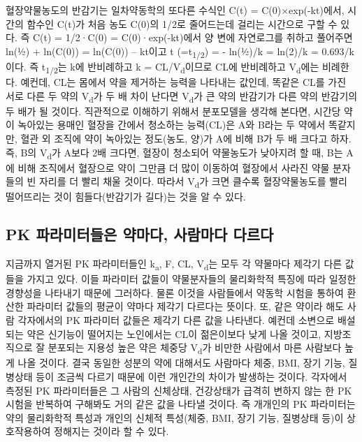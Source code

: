 \documentclass[
  11pt,
  krantz2, a4paper, twoside]{krantz}
\theoremstyle{definition}
\theoremstyle{definition}
\theoremstyle{definition}
\theoremstyle{definition}
\theoremstyle{remark}
\begin{document}
혈장약물농도의 반감기는 일차약동학의 또다른 수식인 C(t) = C(0)×exp(-kt)에서, 시간의 함수인 C(t)가 처음 농도 C(0)의 1/2로 줄어드는데 걸리는 시간으로 구할 수 있다. 
즉 C(t) = 1/2·C(0) = C(0)·exp(-kt)에서 양 변에 자연로그를 취하고 풀어주면 ln(½) + ln(C(0)) = ln(C(0)) -- kt이고 t (=t\textsubscript{1/2}) = - ln(½)/k = ln(2)/k = 0.693/k이다.
즉 t\textsubscript{1/2}는 k에 반비례하고 k = CL/V\textsubscript{d}이므로 CL에 반비례하고 V\textsubscript{d}에는 비례한다.
예컨데, CL는 몸에서 약을 제거하는 능력을 나타내는 값인데, 똑같은 CL를 가진 서로 다른 두 약의 V\textsubscript{d}가 두 배 차이 난다면 V\textsubscript{d}가 큰 약의 반감기가 다른 약의 반감기의 두 배가 될 것이다. 
직관적으로 이해하기 위해서 분포모델을 생각해 본다면, 시간당 약이 녹아있는 용매인 혈장을 간에서 청소하는 능력(CL)은 A와 B라는 두 약에서 똑같지만, 혈관 외 조직에 약이 녹아있는 정도(농도, 양)가 A에 비해 B가 두 배 크다고 하자.
즉, B의 V\textsubscript{d}가 A보다 2배 크다면, 혈장이 청소되어 약물농도가 낮아지려 할 때, B는 A에 비해 조직에서 혈장으로 약이 그만큼 더 많이 이동하여 혈장에서 사라진 약물 분자들의 빈 자리를 더 빨리 채울 것이다.
따라서 V\textsubscript{d}가 크면 클수록 혈장약물농도를 빨리 떨어뜨리는 것이 힘들다(반감기가 길다)는 것을 알 수 있다.

\hypertarget{pk-uxd30cuxb77cuxbbf8uxd130uxb4e4uxc740-uxc57duxb9c8uxb2e4-uxc0acuxb78cuxb9c8uxb2e4-uxb2e4uxb974uxb2e4}{%
\subsection{PK 파라미터들은 약마다, 사람마다 다르다}\label{pk-uxd30cuxb77cuxbbf8uxd130uxb4e4uxc740-uxc57duxb9c8uxb2e4-uxc0acuxb78cuxb9c8uxb2e4-uxb2e4uxb974uxb2e4}}

지금까지 열거된 PK 파라미터들인 k\textsubscript{a}, F, CL, V\textsubscript{d}는 모두 각 약물마다 제각기 다른 값들을 가지고 있다.
이들 파라미터 값들이 약물분자들의 물리화학적 특징에 따라 일정한 경향성을 나타내기 때문에 그러하다.
물론 이것을 사람들에서 약동학 시험을 통하여 환산한 파라미터 값들의 평균이
약마다 제각기 다르다는 뜻이다.
또, 같은 약이라 해도 사람 각자에서의 PK 파라미터 값들은 제각기 다른 값을 나타낸다.
예컨데 소변으로 배설되는 약은 신기능이 떨어지는 노인에서는 CL이 젊은이보다 낮게 나올 것이고, 지방조직으로 잘 분포되는 지용성 높은 약은 체중당 V\textsubscript{d}가 비만한 사람에서 마른 사람보다 높게 나올 것이다.
결국 동일한 성분의 약에 대해서도
사람마다 체중, BMI, 장기 기능, 질병상태 등이 조금씩 다르기 때문에 이런 개인간의 차이가 발생하는 것이다.
각자에서 측정된 PK 파라미터들은 그 사람의 신체상태, 건강상태가 급격히 변하지 않는 한 PK 시험을 반복하여 구해봐도 거의 같은 값을 나타낼 것이다.
즉 개개인의 PK 파라미터는 약의 물리화학적 특성과 개인의 신체적 특성(체중, BMI, 장기 기능, 질병상태 등)이 상호작용하여 정해지는 것이라 할 수 있다.
\end{document}
